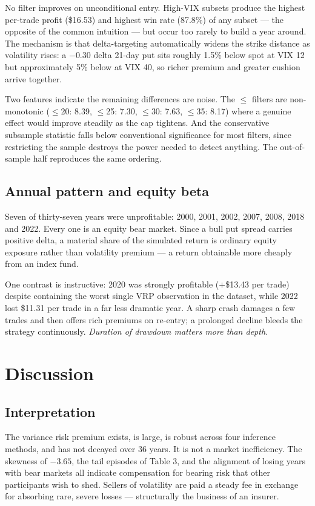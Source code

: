 \documentclass[11pt,a4paper]{article}
\begin{document}
No filter improves on unconditional entry. High-VIX subsets produce the highest per-trade profit
(\$16.53) and highest win rate (87.8\%) of any subset --- the opposite of the common intuition --- but
occur too rarely to build a year around. The mechanism is that delta-targeting automatically widens
the strike distance as volatility rises: a $-0.30$ delta 21-day put sits roughly 1.5\% below spot at
VIX 12 but approximately 5\% below at VIX 40, so richer premium and greater cushion arrive together.

Two features indicate the remaining differences are noise. The $\leq$ filters are non-monotonic
($\leq$20: 8.39, $\leq$25: 7.30, $\leq$30: 7.63, $\leq$35: 8.17) where a genuine effect would improve
steadily as the cap tightens. And the conservative subsample statistic falls below conventional
significance for most filters, since restricting the sample destroys the power needed to detect
anything. The out-of-sample half reproduces the same ordering.

\subsection{Annual pattern and equity beta}

Seven of thirty-seven years were unprofitable: 2000, 2001, 2002, 2007, 2008, 2018 and 2022. Every one
is an equity bear market. Since a bull put spread carries positive delta, a material share of the
simulated return is ordinary equity exposure rather than volatility premium --- a return obtainable
more cheaply from an index fund.

One contrast is instructive: 2020 was strongly profitable ($+$\$13.43 per trade) despite containing the
worst single VRP observation in the dataset, while 2022 lost \$11.31 per trade in a far less dramatic
year. A sharp crash damages a few trades and then offers rich premiums on re-entry; a prolonged decline
bleeds the strategy continuously. \emph{Duration of drawdown matters more than depth.}

\section{Discussion}

\subsection{Interpretation}

The variance risk premium exists, is large, is robust across four inference methods, and has not decayed
over 36 years. It is not a market inefficiency. The skewness of $-3.65$, the tail episodes of Table 3,
and the alignment of losing years with bear markets all indicate compensation for bearing risk that
other participants wish to shed. Sellers of volatility are paid a steady fee in exchange for absorbing
rare, severe losses --- structurally the business of an insurer.
\end{document}
